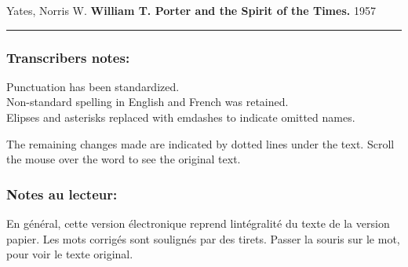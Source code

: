 \documentclass[14pt,a4paper]{memoir}
\begin{document}
Yates, Norris W. \textbf{William T. Porter and the Spirit of the Times.}
1957

\begin{center}\rule{0.5\linewidth}{0.5pt}\end{center}

\protect\hypertarget{4533318093929944247_33931-h-3.htm.xhtml}{}{}

\hypertarget{4533318093929944247_33931-h-3.htm.xhtmlux5cux23pgepubid00035}{}
\subsubsection{Transcriber\textquotesingle s notes:}

Punctuation has been standardized.\\
Non-standard spelling in English and French was retained.\\
Elipses and asterisks replaced with emdashes to indicate omitted names.

The remaining changes made are indicated by dotted lines under the text.
Scroll the mouse over the word to see the original text.

\hypertarget{4533318093929944247_33931-h-3.htm.xhtmlux5cux23pgepubid00036}{%
\subsubsection{Notes au
lecteur:}\label{4533318093929944247_33931-h-3.htm.xhtmlux5cux23pgepubid00036}}

En général, cette version électronique reprend
l\textquotesingle intégralité du texte de la version papier. Les mots
corrigés sont soulignés par des tirets. Passer la souris sur le mot,
pour voir le texte original.

\begin{verbatim}
\end{verbatim}

\protect\hypertarget{4533318093929944247_33931-h-4.htm.xhtml}{}{}

\hypertarget{4533318093929944247_33931-h-4.htm.xhtmlux5cux23pg-end-separator}{}
\end{document}
